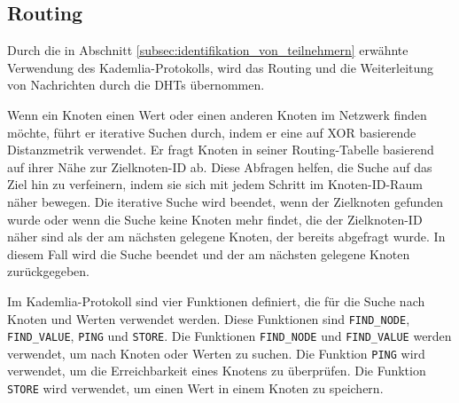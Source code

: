 \subsection{Routing}


Durch die in Abschnitt \ref{subsec:identifikation_von_teilnehmern} erwähnte 
Verwendung des Kademlia-Protokolls, wird das Routing und die Weiterleitung von
Nachrichten durch die DHTs übernommen.

Wenn ein Knoten einen Wert oder einen anderen Knoten im Netzwerk finden möchte, 
führt er iterative Suchen durch, indem er eine auf XOR basierende Distanzmetrik 
verwendet. Er fragt Knoten in seiner Routing-Tabelle basierend auf ihrer Nähe 
zur Zielknoten-ID ab. Diese Abfragen helfen, die Suche auf das Ziel hin zu verfeinern, 
indem sie sich mit jedem Schritt im Knoten-ID-Raum näher bewegen. Die iterative
Suche wird beendet, wenn der Zielknoten gefunden wurde oder wenn die Suche
keine Knoten mehr findet, die der Zielknoten-ID näher sind als der am nächsten
gelegene Knoten, der bereits abgefragt wurde. In diesem Fall wird die Suche
beendet und der am nächsten gelegene Knoten zurückgegeben.

Im Kademlia-Protokoll sind vier Funktionen definiert, die für die Suche nach
Knoten und Werten verwendet werden. Diese Funktionen sind \texttt{FIND\_NODE},
\texttt{FIND\_VALUE}, \texttt{PING} und \texttt{STORE}. Die Funktionen
\texttt{FIND\_NODE} und \texttt{FIND\_VALUE} werden verwendet, um nach Knoten
oder Werten zu suchen. Die Funktion \texttt{PING} wird verwendet, um die
Erreichbarkeit eines Knotens zu überprüfen. Die Funktion \texttt{STORE} wird
verwendet, um einen Wert in einem Knoten zu speichern.


